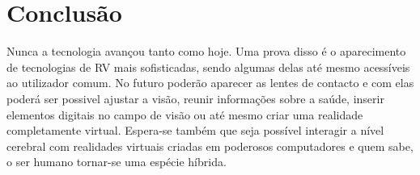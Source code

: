 \chapter{Conclusão}

Nunca a tecnologia avançou tanto como hoje. Uma prova disso é o aparecimento de tecnologias de \acl{RV} mais sofisticadas, sendo algumas delas até mesmo acessíveis ao utilizador comum.
No futuro poderão aparecer as lentes de contacto e com elas poderá ser possivel ajustar a visão, reunir informações sobre a saúde, inserir elementos digitais no campo de visão ou até mesmo criar uma realidade completamente virtual.
Espera-se também que seja possível interagir a nível cerebral com realidades virtuais criadas em poderosos computadores e quem sabe, o ser humano tornar-se uma espécie híbrida.